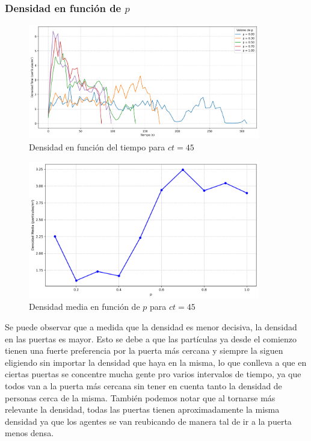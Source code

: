 \documentclass[12pt]{article}
\begin{document}
\subsubsection{Densidad en función de $p$}

\begin{figure}[H]
    \centering
    \includegraphics[width=0.9\textwidth]{img/density_vs_time_t45.png}
    \caption{Densidad en función del tiempo para $ct=45$}
    \label{fig:flow_p100}
\end{figure}

\begin{figure}[H]
    \centering
    \includegraphics[width=0.9\textwidth]{img/average_density_t45.png}
    \caption{Densidad media en función de $p$ para $ct=45$}
    \label{fig:flow_p100}
\end{figure}

Se puede observar que a medida que la densidad es menor decisiva, la densidad en las puertas es mayor. Esto se debe a que las partículas ya desde el comienzo tienen una fuerte preferencia por la puerta más cercana y siempre la siguen eligiendo sin importar la densidad que haya en la misma, lo que conlleva a que en ciertas puertas se concentre mucha gente pro varios intervalos de tiempo, ya que todos van a la puerta más cercana sin tener en cuenta tanto la densidad de personas cerca de la misma. 
También podemos notar que al tornarse más relevante la densidad, todas las puertas tienen aproximadamente la misma densidad ya que los agentes se van reubicando de manera tal de ir a la puerta menos densa.
\end{document}
